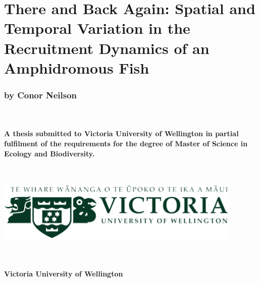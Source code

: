 \documentclass[]{book}
\author{Conor Neilson}
\date{}
\begin{document}
{
\setcounter{tocdepth}{1}
\tableofcontents
}
\chapter*{There and Back Again: Spatial and Temporal Variation in the
Recruitment Dynamics of an Amphidromous
Fish}\label{there-and-back-again-spatial-and-temporal-variation-in-the-recruitment-dynamics-of-an-amphidromous-fish}

\subsection*{by Conor Neilson}\label{by-conor-neilson}

~ ~ ~

\subsubsection*{A thesis submitted to Victoria University of Wellington
in partial fulfilment of the requirements for the degree of Master of
Science in Ecology and
Biodiversity.}\label{a-thesis-submitted-to-victoria-university-of-wellington-in-partial-fulfilment-of-the-requirements-for-the-degree-of-master-of-science-in-ecology-and-biodiversity.}

~

\begin{center}\includegraphics{images/cover-image} \end{center}

~

\subsubsection*{Victoria University of
Wellington}\label{victoria-university-of-wellington}
\end{document}
